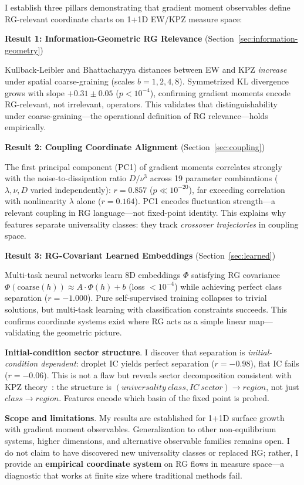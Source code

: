 \documentclass[aps,pre,reprint,amsmath,amssymb,superscriptaddress]{revtex4-2}
\begin{document}
I establish three pillars demonstrating that gradient moment observables define RG-relevant coordinate charts on 1+1D EW/KPZ measure space:

\textbf{Result 1: Information-Geometric RG Relevance} (Section~\ref{sec:information-geometry})

Kullback-Leibler and Bhattacharyya distances between EW and KPZ \textit{increase} under spatial coarse-graining (scales $b=1,2,4,8$). Symmetrized KL divergence grows with slope $+0.31 \pm 0.05$ ($p < 10^{-4}$), confirming gradient moments encode RG-relevant, not irrelevant, operators. This validates that distinguishability under coarse-graining---the operational definition of RG relevance---holds empirically.

\textbf{Result 2: Coupling Coordinate Alignment} (Section~\ref{sec:coupling})

The first principal component (PC1) of gradient moments correlates strongly with the noise-to-dissipation ratio $D/\nu^3$ across 19 parameter combinations ($\lambda,\nu,D$ varied independently): $r = 0.857$ ($p \ll 10^{-20}$), far exceeding correlation with nonlinearity $\lambda$ alone ($r=0.164$). PC1 encodes fluctuation strength---a relevant coupling in RG language---not fixed-point identity. This explains why features separate universality classes: they track \textit{crossover trajectories} in coupling space.

\textbf{Result 3: RG-Covariant Learned Embeddings} (Section~\ref{sec:learned})

Multi-task neural networks learn 8D embeddings $\Phi$ satisfying RG covariance $\Phi(\text{coarse}(h)) \approx A \cdot \Phi(h) + b$ (loss $<10^{-4}$) while achieving perfect class separation ($r=-1.000$). Pure self-supervised training collapses to trivial solutions, but multi-task learning with classification constraints succeeds. This confirms coordinate systems exist where RG acts as a simple linear map---validating the geometric picture.

\textbf{Initial-condition sector structure}. I discover that separation is \textit{initial-condition dependent}: droplet IC yields perfect separation ($r=-0.98$), flat IC fails ($r=-0.06$). This is not a flaw but reveals sector decomposition consistent with KPZ theory~\cite{Ferrari2011}: the structure is $(universality\ class, IC\ sector) \to region$, not just $class \to region$. Features encode which basin of the fixed point is probed.

\textbf{Scope and limitations}. My results are established for 1+1D surface growth with gradient moment observables. Generalization to other non-equilibrium systems, higher dimensions, and alternative observable families remains open. I do not claim to have discovered new universality classes or replaced RG; rather, I provide an \textbf{empirical coordinate system} on RG flows in measure space---a diagnostic that works at finite size where traditional methods fail.
\end{document}
